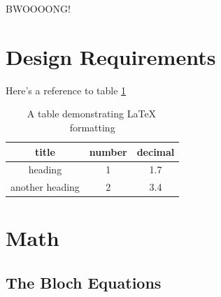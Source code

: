 \documentclass{workreport}
\begin{document}
\begin{body}
	\lipsum[1]

	BWOOOONG!

\section{Design Requirements}

	\lipsum[1-2]

Here's a reference to table \ref{tbl:exampletable}

\begin{table}

	\centering

	\begin{tabular}{|c|c|c|} \hline
		title & number & decimal \\ \hline
		heading & 1 & 1.7 \\ \hline
		another heading & 2 & 3.4 \\ \hline
	\end{tabular}
	\caption{A table demonstrating \LaTeX \, formatting}

	\label{tbl:exampletable}

\end{table}

\section{Math}

	\lipsum[1]

\subsection{The Bloch Equations}


\end{body}
\end{document}
